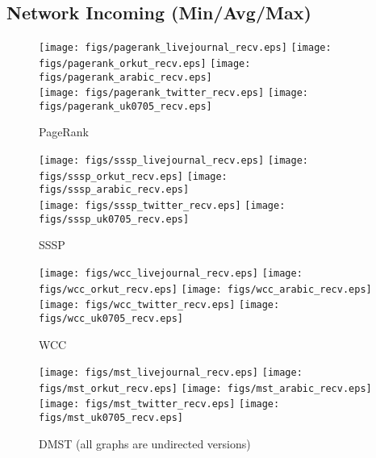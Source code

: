 \documentclass{article}
\newcommand{\bline}[1][1]{\vspace{#1\baselineskip}}
\begin{document}
\pagebreak
\subsection{Network Incoming (Min/Avg/Max)}
\begin{figure}[!h]
  \bline[1]
  \centering
  \texttt{[image: figs/pagerank\_livejournal\_recv.eps]}\hspace{1em}%
  \texttt{[image: figs/pagerank\_orkut\_recv.eps]}\hspace{1em}%
  \texttt{[image: figs/pagerank\_arabic\_recv.eps]}\\
  \texttt{[image: figs/pagerank\_twitter\_recv.eps]}\hspace{1em}%
  \texttt{[image: figs/pagerank\_uk0705\_recv.eps]}
  \caption{PageRank}
\end{figure}

\begin{figure}[!h]
  \bline[3.5]
  \centering
  \texttt{[image: figs/sssp\_livejournal\_recv.eps]}\hspace{1em}%
  \texttt{[image: figs/sssp\_orkut\_recv.eps]}\hspace{1em}%
  \texttt{[image: figs/sssp\_arabic\_recv.eps]}\\
  \texttt{[image: figs/sssp\_twitter\_recv.eps]}\hspace{1em}%
  \texttt{[image: figs/sssp\_uk0705\_recv.eps]}
  \caption{SSSP}
\end{figure}

\begin{figure}[!h]
  \bline[3.5]
  \centering
  \texttt{[image: figs/wcc\_livejournal\_recv.eps]}\hspace{1em}%
  \texttt{[image: figs/wcc\_orkut\_recv.eps]}\hspace{1em}%
  \texttt{[image: figs/wcc\_arabic\_recv.eps]}\\
  \texttt{[image: figs/wcc\_twitter\_recv.eps]}\hspace{1em}%
  \texttt{[image: figs/wcc\_uk0705\_recv.eps]}
  \caption{WCC}
\end{figure}

\begin{figure}[!h]
  \bline[3.5]
  \centering
  \texttt{[image: figs/mst\_livejournal\_recv.eps]}\hspace{1em}%
  \texttt{[image: figs/mst\_orkut\_recv.eps]}\hspace{1em}%
  \texttt{[image: figs/mst\_arabic\_recv.eps]}\\
  \texttt{[image: figs/mst\_twitter\_recv.eps]}\hspace{1em}%
  \texttt{[image: figs/mst\_uk0705\_recv.eps]}
  \caption{DMST (all graphs are undirected versions)}
\end{figure}
\end{document}
